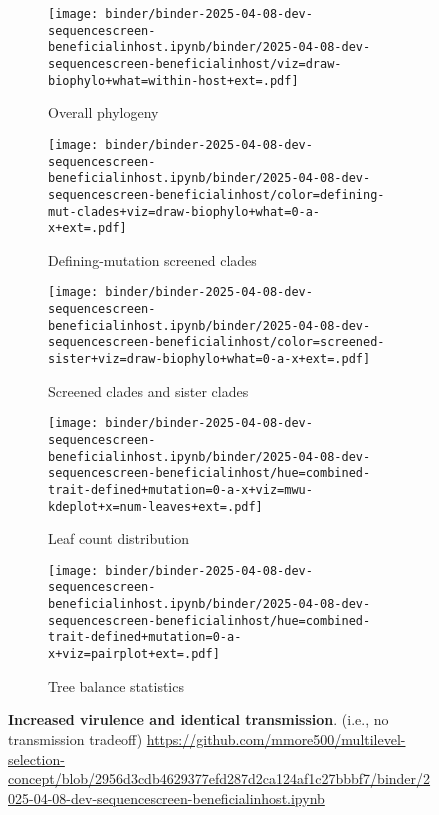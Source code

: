 \begin{figure*}[htbp]
  \centering
  \begin{subfigure}{0.32\textwidth}
    \centering
    \texttt{[image: binder/binder-2025-04-08-dev-sequencescreen-beneficialinhost.ipynb/binder/2025-04-08-dev-sequencescreen-beneficialinhost/viz=draw-biophylo+what=within-host+ext=.pdf]}
    \caption{Overall phylogeny}
    \label{fig:dev-sequencescreen-beneficialinhost:overall_phylogeny}
  \end{subfigure}
  \hfill
  \begin{subfigure}{0.32\textwidth}
    \centering
    \texttt{[image: binder/binder-2025-04-08-dev-sequencescreen-beneficialinhost.ipynb/binder/2025-04-08-dev-sequencescreen-beneficialinhost/color=defining-mut-clades+viz=draw-biophylo+what=0-a-x+ext=.pdf]}
    \caption{Defining-mutation screened clades}
    \label{fig:dev-sequencescreen-beneficialinhost:defining_mut_clades}
  \end{subfigure}
  \hfill
  \begin{subfigure}{0.32\textwidth}
    \centering
    \texttt{[image: binder/binder-2025-04-08-dev-sequencescreen-beneficialinhost.ipynb/binder/2025-04-08-dev-sequencescreen-beneficialinhost/color=screened-sister+viz=draw-biophylo+what=0-a-x+ext=.pdf]}
    \caption{Screened clades and sister clades}
    \label{fig:dev-sequencescreen-beneficialinhost:screened_sister}
  \end{subfigure}

  \vspace{0.5cm} %

  \begin{subfigure}{0.54\textwidth}
    \centering
    \texttt{[image: binder/binder-2025-04-08-dev-sequencescreen-beneficialinhost.ipynb/binder/2025-04-08-dev-sequencescreen-beneficialinhost/hue=combined-trait-defined+mutation=0-a-x+viz=mwu-kdeplot+x=num-leaves+ext=.pdf]}
    \caption{Leaf count distribution}
    \label{fig:dev-sequencescreen-beneficialinhost:leaf_count}
  \end{subfigure}
  \hfill
  \begin{subfigure}{0.44\textwidth}
    \centering
    \texttt{[image: binder/binder-2025-04-08-dev-sequencescreen-beneficialinhost.ipynb/binder/2025-04-08-dev-sequencescreen-beneficialinhost/hue=combined-trait-defined+mutation=0-a-x+viz=pairplot+ext=.pdf]}
    \caption{Tree balance statistics}
    \label{fig:dev-sequencescreen-beneficialinhost:tree_balance}
  \end{subfigure}

  \caption{\textbf{Increased virulence and identical transmission}. (i.e., no transmission tradeoff) \url{https://github.com/mmore500/multilevel-selection-concept/blob/2956d3cdb4629377efd287d2ca124af1c27bbbf7/binder/2025-04-08-dev-sequencescreen-beneficialinhost.ipynb}}
  \label{fig:dev-sequencescreen-beneficialinhost}
\end{figure*}
